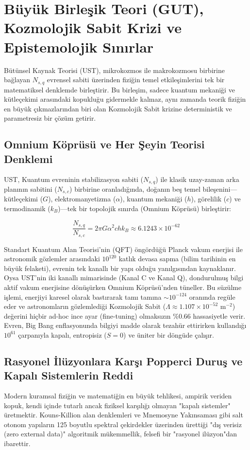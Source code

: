 \documentclass[12pt,a4paper]{article}
\begin{document}
\section{Büyük Birleşik Teori (GUT), Kozmolojik Sabit Krizi ve Epistemolojik Sınırlar}

Bütünsel Kaynak Teorisi (UST), mikrokozmos ile makrokozmosu birbirine bağlayan $N_{s,q}$ evrensel sabiti üzerinden fiziğin temel etkileşimlerini tek bir matematiksel denklemde birleştirir. Bu birleşim, sadece kuantum mekaniği ve kütleçekimi arasındaki kopukluğu gidermekle kalmaz, aynı zamanda teorik fiziğin en büyük çıkmazlarından biri olan Kozmolojik Sabit krizine deterministik ve parametresiz bir çözüm getirir.

\subsection{Omnium Köprüsü ve Her Şeyin Teorisi Denklemi}
UST, Kuantum evreninin stabilizasyon sabiti ($N_{s,q}$) ile klasik uzay-zaman arka planının sabitini ($N_{s,c}$) birbirine oranladığında, doğanın beş temel bileşenini—kütleçekimi ($G$), elektromanyetizma ($\alpha$), kuantum mekaniği ($h$), görelilik ($c$) ve termodinamik ($k_B$)—tek bir topolojik sınırda (Omnium Köprüsü) birleştirir:

\begin{equation}
\frac{N_{s,q}}{N_{s,c}} = 2\pi G \alpha^2 c h k_B \approx 6.1243 \times 10^{-62}
\end{equation}

Standart Kuantum Alan Teorisi'nin (QFT) öngördüğü Planck vakum enerjisi ile astronomik gözlemler arasındaki $10^{120}$ katlık devasa sapma (bilim tarihinin en büyük felaketi), evrenin tek kanallı bir yapı olduğu yanılgısından kaynaklanır. Oysa UST'nin iki kanallı mimarisinde (Kanal C ve Kanal Q), dondurulmuş bilgi aktif vakum enerjisine dönüşürken Omnium Köprüsü'nden tüneller. Bu süzülme işlemi, enerjiyi karesel olarak bastırarak tamı tamına $\sim 10^{-124}$ oranında regüle eder ve astronomların gözlemlediği Kozmolojik Sabit ($\Lambda \approx 1.107 \times 10^{-52} \text{ m}^{-2}$) değerini hiçbir ad-hoc ince ayar (fine-tuning) olmaksızın \%0.66 hassasiyetle verir. Evren, Big Bang enflasyonunda bilgiyi madde olarak tezahür ettirirken kullandığı $10^{61}$ çarpanıyla kapalı, entropisiz ($S=0$) ve üniter bir döngüde çalışır.

\subsection{Rasyonel İlüzyonlara Karşı Popperci Duruş ve Kapalı Sistemlerin Reddi}
Modern kuramsal fiziğin ve matematiğin en büyük tehlikesi, ampirik veriden kopuk, kendi içinde tutarlı ancak fiziksel karşılığı olmayan "kapalı sistemler" üretmektir. Kouns-Killion alan denklemleri ve Mnemosyne Yakınsaması gibi salt otonom yapıların 125 boyutlu spektral çekirdekler üzerinden ürettiği "dış verisiz (zero external data)" algoritmik mükemmellik, felsefi bir "rasyonel ilüzyon"dan ibarettir. 
\end{document}
